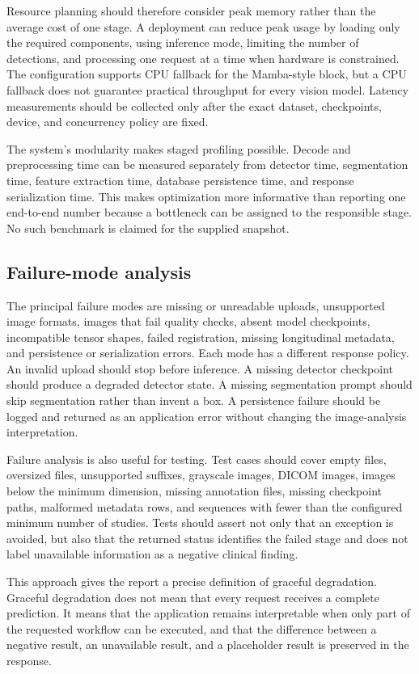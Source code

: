 \documentclass[12pt,a4paper]{article}
\begin{document}
Resource planning should therefore consider peak memory rather than the average cost of one stage. A deployment can reduce peak usage by loading only the required components, using inference mode, limiting the number of detections, and processing one request at a time when hardware is constrained. The configuration supports CPU fallback for the Mamba-style block, but a CPU fallback does not guarantee practical throughput for every vision model. Latency measurements should be collected only after the exact dataset, checkpoints, device, and concurrency policy are fixed.

The system's modularity makes staged profiling possible. Decode and preprocessing time can be measured separately from detector time, segmentation time, feature extraction time, database persistence time, and response serialization time. This makes optimization more informative than reporting one end-to-end number because a bottleneck can be assigned to the responsible stage. No such benchmark is claimed for the supplied snapshot.

\subsection{Failure-mode analysis}
The principal failure modes are missing or unreadable uploads, unsupported image formats, images that fail quality checks, absent model checkpoints, incompatible tensor shapes, failed registration, missing longitudinal metadata, and persistence or serialization errors. Each mode has a different response policy. An invalid upload should stop before inference. A missing detector checkpoint should produce a degraded detector state. A missing segmentation prompt should skip segmentation rather than invent a box. A persistence failure should be logged and returned as an application error without changing the image-analysis interpretation.

Failure analysis is also useful for testing. Test cases should cover empty files, oversized files, unsupported suffixes, grayscale images, DICOM images, images below the minimum dimension, missing annotation files, missing checkpoint paths, malformed metadata rows, and sequences with fewer than the configured minimum number of studies. Tests should assert not only that an exception is avoided, but also that the returned status identifies the failed stage and does not label unavailable information as a negative clinical finding.

This approach gives the report a precise definition of graceful degradation. Graceful degradation does not mean that every request receives a complete prediction. It means that the application remains interpretable when only part of the requested workflow can be executed, and that the difference between a negative result, an unavailable result, and a placeholder result is preserved in the response.
\end{document}

